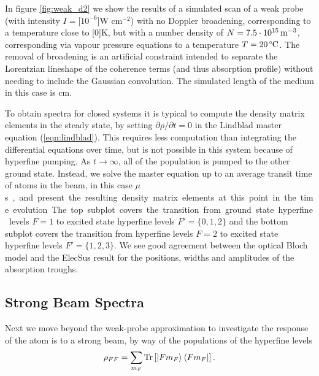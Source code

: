     In figure \ref{fig:weak_d2} we show the results of a simulated scan of a
    weak probe (with intensity $I = $\unit[$10^{-6}$]{W cm$^{-2}$}) with no
    Doppler broadening, corresponding to a temperature close to \unit[$0$]{K},
    but with a number density of $N = \unit[7.5\cdot10^{15}]{m^{-3}}$,
    corresponding via  vapour pressure equations\cite{Zentile2015} to a
    temperature $T = \unit[20]{\text{\textdegree C}}$. The removal of broadening
    is an artificial constraint intended to separate the Lorentzian lineshape of
    the coherence terms (and thus absorption profile) without needing to include
    the Gaussian convolution. The simulated length of the medium in this case is
    \unit[1]{cm}.

    To obtain spectra for closed systems it is typical to compute the density
    matrix elements in the steady state, \ie by setting  $\partial \rho /
    \partial t = 0$ in the Lindblad master equation (\ref{eqn:lindblad}). This
    requires less computation than integrating the differential equations over
    time, but is not possible in this system because of hyperfine pumping. As $t
    \rightarrow \infty$, all of the population is pumped to the other ground
    state. Instead, we solve the master equation up to an average transit time
    of atoms in the beam, in this case \unit[2]{$\mu$s}, and present the
    resulting density matrix elements at this point in the time evolution.


    The top subplot covers the transition from ground state hyperfine levels $F
    = 1$ to excited state hyperfine levels $F' = \{ 0, 1, 2 \}$ and the bottom
    subplot covers the transition from hyperfine levels $F = 2$ to excited state
    hyperfine levels $F' = \{ 1, 2, 3 \}$. We see good agreement between the
    optical Bloch model and the ElecSus result for the positions, widths and
    amplitudes of the absorption troughs.

  \subsection{Strong Beam Spectra}

    Next we move beyond the weak-probe approximation to investigate the response
    of the atom is to a strong beam, by way of the populations of the hyperfine
    levels
    \begin{equation}
      \rho_{FF} = \sum_{m_F} \operatorname{Tr} \left[ \Ket{F m_F} \Bra{F m_F} \right].
    \end{equation}

